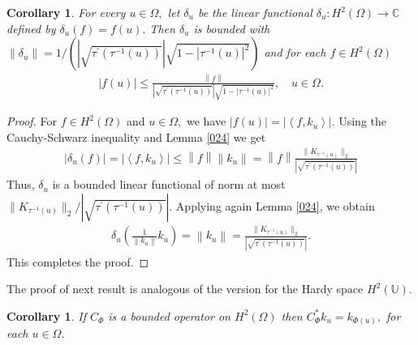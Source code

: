 \documentclass[11pt]{amsart}%
\newtheorem{cor}[thm]{Corollary}
\theoremstyle{definition}
\theoremstyle{remark}
\numberwithin{equation}{section}
\begin{document}
\begin{cor}
For every $u\in \Omega,$ let $\delta_u$ be the linear functional $\delta_u:H^2(\Omega)\longrightarrow \mathbb{C}$ defined by $\delta_u(f)=f(u).$ Then $\delta_u$ is bounded with $\left\| \delta_u\right\| =1/(|\sqrt{ \tau^{\prime}(\tau^{-1}(u))}|\sqrt{1-|\tau^{-1}(u)|^2})$ and for each $f\in H^2(\Omega)$
\begin{align*}
|f(u)| \leq  \frac{\left\| f\right\|}{ |\sqrt{ \tau^{\prime}(\tau^{-1}(u))}|\sqrt{1-|\tau^{-1}(u)|^2}}, \quad u\in \Omega.
\end{align*}
\end{cor}
\begin{proof}
For $f\in H^2(\Omega) $ and $u\in \Omega,$ we have $|f(u)|=|\left\langle f, k_u\right\rangle |$. Using the Cauchy-Schwarz inequality and Lemma \ref{024} we get
\begin{align*}
|\delta_u(f)|=|\left\langle f, k_u\right\rangle |\leq \left\| f\right\|  \left\| k_u\right\|= \left\| f\right\|\frac{\parallel K_{\tau^{-1}(u)}\parallel_2}{| \sqrt{\tau^{\prime}(\tau^{-1}(u))}|}
\end{align*}
Thus, $\delta_u$ is a bounded linear functional of norm at most $\parallel 
K_{\tau^{-1}(u)}\parallel_2 /|\sqrt{\tau^{\prime}(\tau^{-1}(u))}|.$ Applying again Lemma \ref{024}, we obtain 
\begin{align*}
\delta_u\left( \frac{1}{\left\| k_u\right\|}k_u \right) =\left\| k_u\right\|
= \frac{\parallel K_{\tau^{-1}(u)}\parallel_2}{| \sqrt{\tau^{\prime}(\tau^{-1}(u))}|}.
\end{align*}
This completes the proof.
\end{proof}
The proof of next result is analogous of the version for the Hardy space $H^2(\mathbb{U}).$

\begin{cor}
\label{023} If $C_{\Phi}$ is a bounded operator on $H^2(\Omega)$ then $C_{\Phi}^{*}k_{u}=k_{\Phi(u)},$ for
each $u\in\Omega.$
\end{cor}
\end{document}
